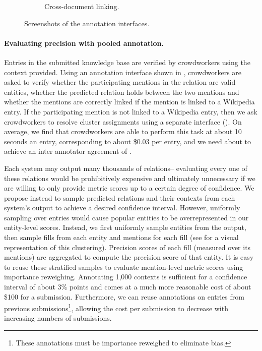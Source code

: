 \begin{figure}
\begin{subfigure}{0.31\textwidth}
  \caption{\label{fig:linking-interface} Cross-document linking.}
\end{subfigure}
\caption{\label{fig:interfaces} Screenshots of the annotation interfaces.}
\end{figure}

\paragraph{Evaluating precision with pooled annotation.}
Entries in the submitted knowledge base are verified by crowdworkers using the context provided.   
Using an annotation interface shown in ,
crowdworkers are asked to verify 
  whether the participating mentions in the relation are valid entities,
  whether the predicted relation holds between the two mentions and
  whether the mentions are correctly linked if the mention is linked to a Wikipedia entry.
If the participating mention is not linked to a Wikipedia entry,
then we ask crowdworkers to resolve cluster assignments using a separate interface ().
On average, we find that crowdworkers are able to perform this task at about 10 seconds an entry, corresponding to about \$0.03 per entry, and we need about  to achieve an inter annotator agreement of .

Each system may output many thousands of relations-- evaluating every one of these relations would be prohibitively expensive
  and ultimately unnecessary if we are willing to only provide metric scores up to a certain degree of confidence.
We propose instead to sample predicted relations and their contexts from each system's output to achieve a desired confidence interval.
However, uniformly sampling over entries would cause popular entities to be overrepresented in our entity-level scores.
Instead, we first uniformly sample entities from the output, then sample fills from each entity and mentions for each fill (see  for a visual representation of this clustering).
Precision scores of each fill (measured over its mentions) are aggregated to compute the precision score of that entity.
It is easy to reuse these stratified samples to evaluate mention-level metric scores using importance reweighing. 
Annotating 1,000 contexts is sufficient for a confidence interval of about 3\% points and comes at a much more reasonable cost of about \$100 for a submission. 
Furthermore, we can reuse annotations on entries from previous submissions\footnote{
These annotations must be importance reweighed to eliminate bias.},
  allowing the cost per submission to decrease with increasing numbers of submissions.

